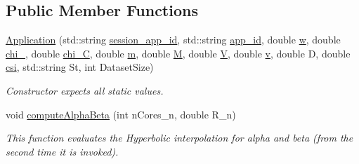 \subsection*{Public Member Functions}
\begin{DoxyCompactItemize}
\item 
\hyperlink{classApplication_aa660e2135b162cfddaca0918be8599e8}{Application} (std\-::string \hyperlink{classApplication_a5e28ffadb86925ecae57ab18c0085d90}{session\-\_\-app\-\_\-id}, std\-::string \hyperlink{classApplication_a05377e6cdcb9d48f29e0f1972a4a16fe}{app\-\_\-id}, double \hyperlink{classApplication_aead1b7b0150c2a3ebd6c36b1db8c4732}{w}, double \hyperlink{classApplication_a3b9dab40d189989c836b8d328946bbb6}{chi\-\_}, double \hyperlink{classApplication_a46e29a6bfc74de610feec809a77dfb62}{chi\-\_\-\-C}, double \hyperlink{classApplication_ab903d83d3cde51569a27f97752c9f158}{m}, double \hyperlink{classApplication_a14904a2abf46cc0a50eb82043fa0912e}{M}, double \hyperlink{classApplication_aa92ad37e6701931176e0dc9b260fd7ee}{V}, double \hyperlink{classApplication_a9efc167094a42382504dd28a7ac402e0}{v}, double D, double \hyperlink{classApplication_a20adc533c6b6147342b3f60dc0fbd9bc}{csi}, std\-::string St, int Dataset\-Size)
\begin{DoxyCompactList}\small\item\em Constructor expects all static values. \end{DoxyCompactList}\item 
void \hyperlink{classApplication_a9e86a23b1be9e49c0a890f9cf1abb7fe}{compute\-Alpha\-Beta} (int n\-Cores\-\_\-n, double R\-\_\-n)
\begin{DoxyCompactList}\small\item\em This function evaluates the Hyperbolic interpolation for alpha and beta (from the second time it is invoked). \end{DoxyCompactList}\end{DoxyCompactItemize}

